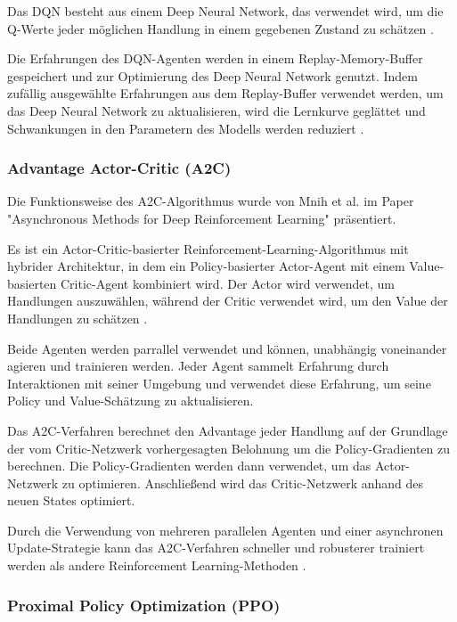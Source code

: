 \documentclass[oneside,bibliography=totocnumbered,BCOR=5mm]{scrbook}%
\theoremstyle{definition}
\theoremstyle{definition}
\theoremstyle{definition}
\theoremstyle{definition}
\theoremstyle{definition}
\theoremstyle{definition}
\begin{document}
  Das DQN besteht aus einem Deep Neural Network, das verwendet wird, 
  um die Q-Werte jeder möglichen Handlung in einem gegebenen Zustand zu schätzen \autocite[Seite 5]{DQN}. 
 
  Die Erfahrungen des DQN-Agenten werden in einem Replay-Memory-Buffer gespeichert und 
  zur Optimierung des Deep Neural Network genutzt. 
  Indem zufällig ausgewählte Erfahrungen aus dem Replay-Buffer verwendet werden, um das Deep Neural Network zu aktualisieren,
  wird die Lernkurve geglättet und Schwankungen in den Parametern des Modells werden reduziert \autocite[Seite 5]{DQN}.
 
\subsubsection{Advantage Actor-Critic (A2C)} 
Die Funktionsweise des A2C-Algorithmus wurde von Mnih et al. im Paper 
  "Asynchronous Methods for Deep Reinforcement Learning" präsentiert. 

  Es ist ein Actor-Critic-basierter Reinforcement-Learning-Algorithmus 
  mit hybrider Architektur, in dem ein Policy-basierter Actor-Agent mit 
  einem Value-basierten Critic-Agent kombiniert wird. 
  Der Actor wird verwendet, um Handlungen auszuwählen, 
  während der Critic verwendet wird, um den Value der Handlungen zu schätzen \autocite[Seite 3]{A2C}.

  Beide Agenten werden parrallel verwendet und können, 
  unabhängig voneinander agieren und trainieren werden. 
  Jeder Agent sammelt Erfahrung durch Interaktionen mit seiner Umgebung und verwendet 
  diese Erfahrung, um seine Policy und Value-Schätzung zu aktualisieren. 
  
  Das A2C-Verfahren berechnet den Advantage jeder Handlung auf der Grundlage der
  vom Critic-Netzwerk vorhergesagten Belohnung um die Policy-Gradienten zu berechnen. 
  Die Policy-Gradienten werden dann verwendet, um das Actor-Netzwerk zu optimieren. 
  Anschließend wird das Critic-Netzwerk anhand des neuen States optimiert.
  
  Durch die Verwendung von mehreren parallelen Agenten und einer asynchronen 
  Update-Strategie kann das A2C-Verfahren schneller und robusterer trainiert 
  werden als andere Reinforcement Learning-Methoden \autocite[Seite 3]{A2C}. 

\subsubsection{Proximal Policy Optimization (PPO)}
\end{document}
